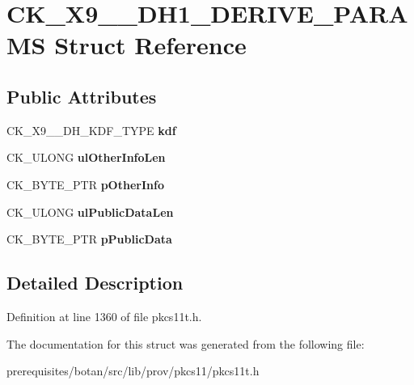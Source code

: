 \hypertarget{struct_c_k___x9__42___d_h1___d_e_r_i_v_e___p_a_r_a_m_s}{}\section{C\+K\+\_\+\+X9\+\_\+\_\+\+D\+H1\+\_\+\+D\+E\+R\+I\+V\+E\+\_\+\+P\+A\+R\+A\+MS Struct Reference}
\label{struct_c_k___x9__42___d_h1___d_e_r_i_v_e___p_a_r_a_m_s}
\subsection*{Public Attributes}
\begin{DoxyCompactItemize}
\item 
\mbox{\label{struct_c_k___x9__42___d_h1___d_e_r_i_v_e___p_a_r_a_m_s_ac146ca5909e4014a93a594a28e1ed1aa}} 
C\+K\+\_\+\+X9\+\_\+\_\+\+D\+H\+\_\+\+K\+D\+F\+\_\+\+T\+Y\+PE {\bfseries kdf}
\item 
\mbox{\label{struct_c_k___x9__42___d_h1___d_e_r_i_v_e___p_a_r_a_m_s_ae1fbe145c010d0da95b6dcbbbbde66b2}} 
C\+K\+\_\+\+U\+L\+O\+NG {\bfseries ul\+Other\+Info\+Len}
\item 
\mbox{\label{struct_c_k___x9__42___d_h1___d_e_r_i_v_e___p_a_r_a_m_s_a04a9225bf31fab76357710bd5db02867}} 
C\+K\+\_\+\+B\+Y\+T\+E\+\_\+\+P\+TR {\bfseries p\+Other\+Info}
\item 
\mbox{\label{struct_c_k___x9__42___d_h1___d_e_r_i_v_e___p_a_r_a_m_s_a018761bbb49073be69643c0611a18a0b}} 
C\+K\+\_\+\+U\+L\+O\+NG {\bfseries ul\+Public\+Data\+Len}
\item 
\mbox{\label{struct_c_k___x9__42___d_h1___d_e_r_i_v_e___p_a_r_a_m_s_afbd09648c23c237f640bbef4d9151161}} 
C\+K\+\_\+\+B\+Y\+T\+E\+\_\+\+P\+TR {\bfseries p\+Public\+Data}
\end{DoxyCompactItemize}


\subsection{Detailed Description}


Definition at line 1360 of file pkcs11t.\+h.



The documentation for this struct was generated from the following file\+:\begin{DoxyCompactItemize}
\item 
prerequisites/botan/src/lib/prov/pkcs11/pkcs11t.\+h\end{DoxyCompactItemize}
